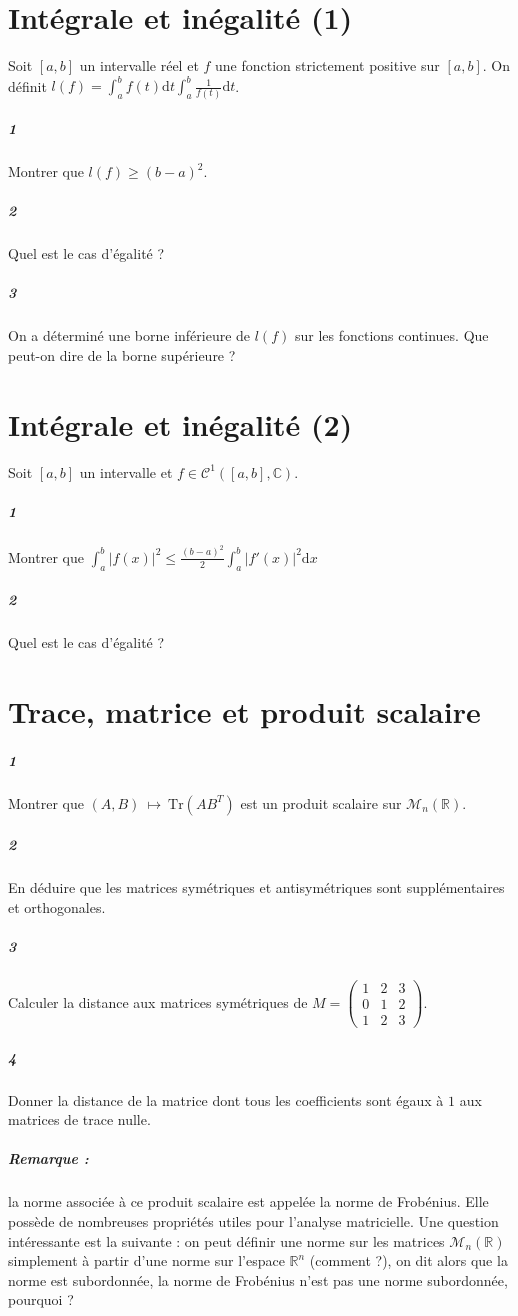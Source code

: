 \documentclass[10pt,a4paper]{article}
\begin{document}
\section{Intégrale et inégalité (1)}
Soit $[a,b]$ un intervalle réel et $f$ une fonction strictement positive sur $[a,b]$. On définit $l(f) = \int_a^b f(t) \text{d}t \int_a^b \frac{1}{f(t)} \text{d}t$.
\subparagraph{1}Montrer que $l(f) \ge (b-a)^2$.
\subparagraph{2}Quel est le cas d'égalité ? 
\subparagraph{3}On a déterminé une borne inférieure de $l(f)$ sur les fonctions continues. Que peut-on dire de la borne supérieure ?
\section{Intégrale et inégalité (2)}
Soit $[a,b]$ un intervalle et $f \in \mathcal{C}^1 ([a,b], \mathbb{C})$.
\subparagraph{1} Montrer que $\int_a^b \vert f(x) \vert^2 \le \frac{(b-a)^2}{2} \int_a^b \vert f'(x) \vert^2 \text{d}x$
\subparagraph{2}Quel est le cas d'égalité ?
\section{Trace, matrice et  produit scalaire}
\subparagraph{1}Montrer que $(A,B) \ \mapsto \ \text{Tr}(AB^T)$ est un produit scalaire sur $\mathcal{M}_n \left( \mathbb{R} \right)$.
\subparagraph{2}En déduire que les matrices symétriques et antisymétriques sont supplémentaires et orthogonales.
\subparagraph{3}Calculer la distance aux matrices symétriques de $M = \left( \begin{matrix} 1 & 2 & 3  \\ 0 & 1 & 2 \\ 1 & 2 & 3 \end{matrix} \right)$.
\subparagraph{4}Donner la distance de la matrice dont tous les coefficients sont égaux à $1$ aux matrices de trace nulle.
\subparagraph{Remarque :} la norme associée à ce produit scalaire est appelée la norme de Frobénius. Elle possède de nombreuses propriétés utiles pour l'analyse matricielle. Une question intéressante est la suivante : on peut définir une norme sur les matrices $\mathcal{M}_n\left( \mathbb{R} \right)$ simplement à partir d'une norme sur l'espace $\mathbb{R}^n$ (comment ?), on dit alors que la norme est subordonnée, la norme de Frobénius n'est pas une norme subordonnée, pourquoi ?
\end{document}
